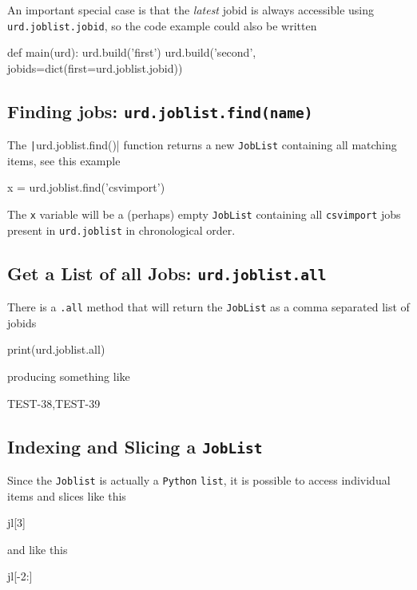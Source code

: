 An important special case is that the \textsl{latest} jobid is always
accessible using \texttt{urd.joblist.jobid}, so the code example could
also be written
\begin{python}
def main(urd):
    urd.build('first')
    urd.build('second', jobids=dict(first=urd.joblist.jobid))
\end{python}



\subsection{Finding jobs:  \texttt{urd.joblist.find(name)}}

The \texttt|urd.joblist.find()| function returns a
new \texttt{JobList} containing all matching items, see this example
\begin{python}
x = urd.joblist.find('csvimport')
\end{python}
The \texttt{x} variable will be a (perhaps) empty \texttt{JobList} containing
all \texttt{csvimport} jobs present in \texttt{urd.joblist} in
chronological order.



\subsection{Get a List of all Jobs: \texttt{urd.joblist.all}}

There is a \texttt{.all} method that will return the \texttt{JobList} as a
comma separated list of jobids
\begin{python}
print(urd.joblist.all)
\end{python}
producing something like
\begin{shell}
TEST-38,TEST-39
\end{shell}



\subsection{Indexing and Slicing a \texttt{JobList}}
Since the \texttt{Joblist} is actually
a \texttt{Python} \texttt{list}, it is possible to access individual
items and slices like this
\begin{python}
jl[3]
\end{python}
and like this
\begin{python}
jl[-2:]
\end{python}




